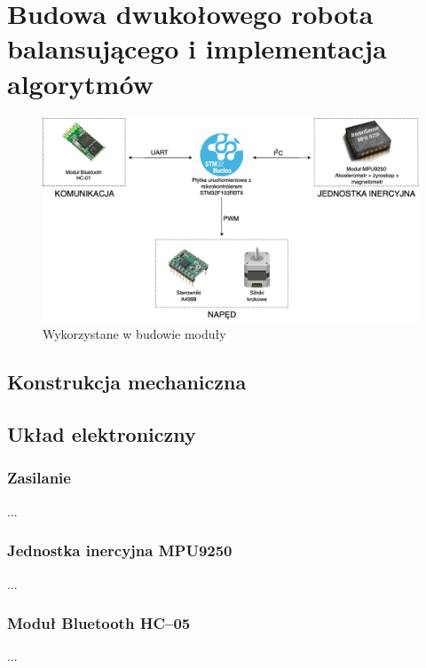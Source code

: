 \chapter{Budowa dwukołowego robota balansującego i implementacja algorytmów}
\label{chap:budowa}

\begin{figure}[h!]
    \centering
    \includegraphics[width=1\textwidth]{Rysunki/Rozdzial05/Platforma_sprzetowa.png}
    \caption{Wykorzystane w budowie moduły}
    \label{Moduly}
\end{figure}

\section{Konstrukcja mechaniczna}

\section{Układ elektroniczny}

\subsection{Zasilanie}
...

\subsection{Jednostka inercyjna MPU9250}
...

\subsection{Moduł Bluetooth HC--05}
...

